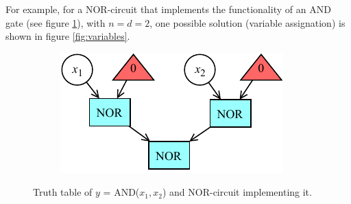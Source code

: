 \documentclass[letterpaper,10pt]{article}
\begin{document}
For example, for a NOR-circuit that implements the functionality of an AND gate (see figure \ref{fig:original}), with $n = d = 2$, one possible solution (variable assignation) is shown in figure \ref{fig:variables}.
\begin{figure}[hbtp]
    \centering
    \begin{subfigure}[b]{0.45\textwidth}
    \end{subfigure}\hspace{-0.2\textwidth}
    \begin{subfigure}[b]{0.45\textwidth}
        \includegraphics[width=\textwidth]{circuit.pdf}
    \end{subfigure}
    \caption{Truth table of $y$ = AND($x_1,x_2$) and NOR-circuit implementing it.}
    \label{fig:original}
\end{figure}
\end{document}
